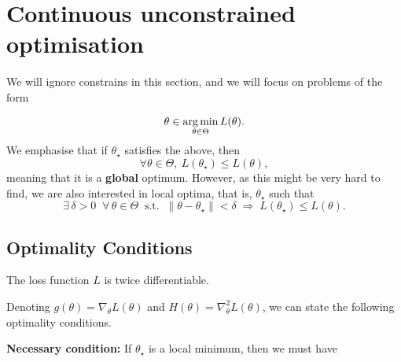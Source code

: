 \begin{mdframed}[style=ejemplo, frametitle={\center Example: XXX}]

\end{mdframed}


\section{Continuous unconstrained optimisation} %
\label{sec:continuous_optimisation}

We will ignore constrains in this section, and we will focus on problems of the form

\begin{equation}
	\theta \in \operatorname*{arg\,min}_{\theta\in\Theta} L(\theta).
\end{equation}
We emphasise that if $\theta_\star$ satisfies the above, then
\begin{equation}
	\forall \theta\in\Theta,~ L(\theta_\star) \leq L(\theta),
\end{equation}
meaning that it is a \textbf{global} optimum. However, as this might be very hard to find, we are also interested in local optima, that is, $\theta_\star$  such that 
\begin{equation}
\exists\, \delta > 0 \;\; \forall\, \theta \in \Theta \;\; 
\text{s.t.} \;\; 
\|\theta - \theta_\star\| < \delta 
\;\Rightarrow\;
L(\theta_\star) \le L(\theta).
\end{equation}


\subsection{Optimality Conditions}
\label{subsec:optimality_conditions}


\begin{assumption}
The loss function $L$ is twice differentiable.
\end{assumption}

Denoting $g(\theta) = \nabla_\theta L(\theta)$ and $H(\theta) = \nabla_\theta^2L(\theta)$, we can state the following optimality conditions. 

\textbf{Necessary condition:} If $\theta_\star$ is a local minimum, then we must have 








